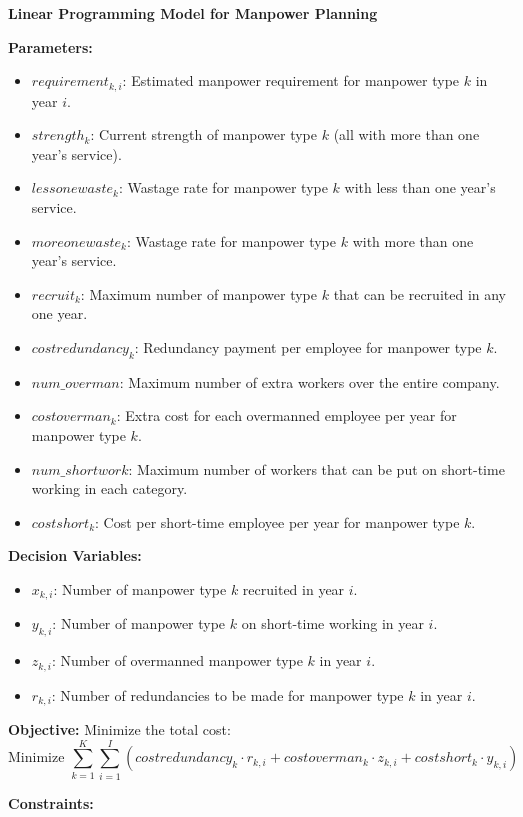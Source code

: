 \documentclass{article}
\begin{document}
\textbf{Linear Programming Model for Manpower Planning}

\textbf{Parameters:}
\begin{itemize}
    \item $requirement_{k,i}$: Estimated manpower requirement for manpower type $k$ in year $i$.
    \item $strength_{k}$: Current strength of manpower type $k$ (all with more than one year's service).
    \item $lessonewaste_{k}$: Wastage rate for manpower type $k$ with less than one year's service.
    \item $moreonewaste_{k}$: Wastage rate for manpower type $k$ with more than one year's service.
    \item $recruit_{k}$: Maximum number of manpower type $k$ that can be recruited in any one year.
    \item $costredundancy_{k}$: Redundancy payment per employee for manpower type $k$.
    \item $num\_overman$: Maximum number of extra workers over the entire company.
    \item $costoverman_{k}$: Extra cost for each overmanned employee per year for manpower type $k$.
    \item $num\_shortwork$: Maximum number of workers that can be put on short-time working in each category.
    \item $costshort_{k}$: Cost per short-time employee per year for manpower type $k$.
\end{itemize}

\textbf{Decision Variables:}
\begin{itemize}
    \item $x_{k,i}$: Number of manpower type $k$ recruited in year $i$.
    \item $y_{k,i}$: Number of manpower type $k$ on short-time working in year $i$.
    \item $z_{k,i}$: Number of overmanned manpower type $k$ in year $i$.
    \item $r_{k,i}$: Number of redundancies to be made for manpower type $k$ in year $i$.
\end{itemize}

\textbf{Objective:}
Minimize the total cost:
\[
\text{Minimize } \sum_{k=1}^{K} \sum_{i=1}^{I} \left( costredundancy_{k} \cdot r_{k,i} + costoverman_{k} \cdot z_{k,i} + costshort_{k} \cdot y_{k,i} \right)
\]

\textbf{Constraints:}
\end{document}
